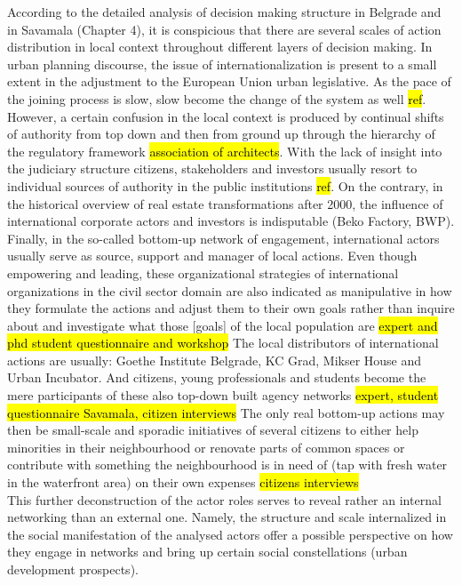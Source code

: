 \documentclass[11pt]{report}
\begin{document}
According to the detailed analysis of decision making structure in Belgrade and in Savamala (Chapter 4), it is conspicious that there are several scales of action distribution in local context throughout different layers of decision making.
In urban planning discourse, the issue of internationalization is present to a small extent in the adjustment to the European Union urban legislative. As the pace of the joining process is slow, slow become the change of the system as well \hl{ref}. 
However, a certain confusion in the local context is produced by continual shifts of authority from top down and then from ground up through the hierarchy of the regulatory framework \hl{association of architects}. With the lack of insight into the judiciary structure citizens, stakeholders and investors usually resort to individual sources of authority in the public institutions \hl{ref}.
On the contrary, in the historical overview of real estate transformations after 2000, the influence of international corporate actors and investors is indisputable (Beko Factory, BWP).
\\
Finally, in the so-called bottom-up network of engagement, international actors usually serve as source, support and manager of local actions. Even though empowering and leading, these organizational strategies of international organizations in the civil sector domain are also indicated as manipulative in how they formulate the actions and adjust them to their own goals rather than inquire about and investigate what those [goals] of the local  population are \hl{expert and phd student questionnaire and workshop}
The local distributors of international actions are usually: Goethe Institute Belgrade, KC Grad, Mikser House and Urban Incubator. And citizens, young professionals and students become the mere participants  of these also top-down built agency networks \hl{expert, student questionnaire Savamala, citizen interviews}
The only real bottom-up actions may then be small-scale and sporadic initiatives of several citizens to either help minorities in their neighbourhood or renovate parts of common spaces or contribute with something the neighbourhood is in need of (tap with fresh water in the waterfront area) on their own expenses \hl{citizens interviews}
\\
This further deconstruction of the actor roles serves to reveal rather an internal networking than an external one. Namely, the structure and scale internalized in the social manifestation of the analysed actors offer a possible perspective on how they engage in networks and bring up certain social constellations (urban development prospects).
\end{document}
